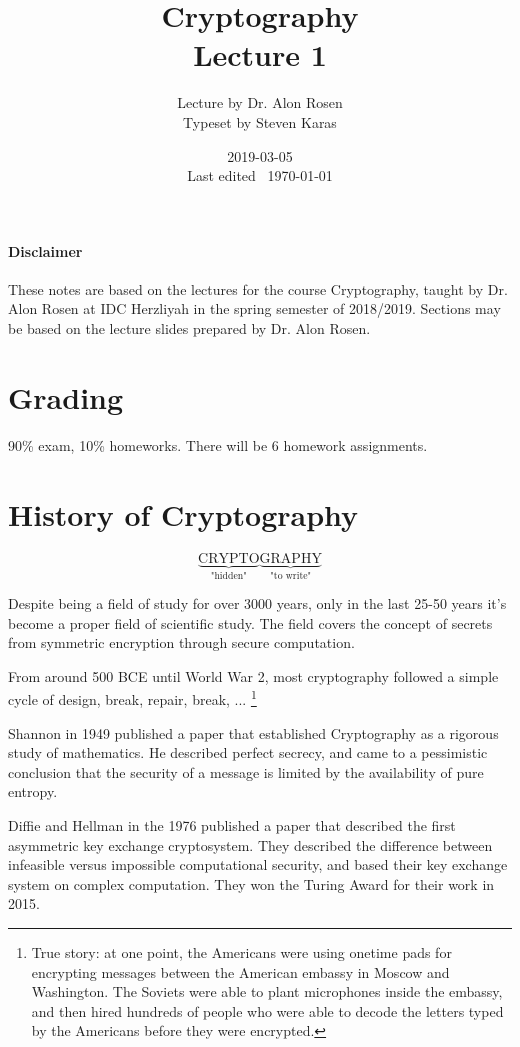\documentclass{idc_msc}
\title{Cryptography \\\large Lecture 1}
\date{2019-03-05 \\ Last edited \currenttime\ \today}
\author{Lecture by Dr. Alon Rosen\\Typeset by Steven Karas}
\begin{document}
\paragraph{Disclaimer}

These notes are based on the lectures for the course Cryptography, taught by Dr. Alon Rosen at IDC Herzliyah in the spring semester of 2018/2019.
Sections may be based on the lecture slides prepared by Dr. Alon Rosen.

\nocite{Katz:2014:IMC:2700550}
\nocite{Goldreich:2000:FCB:519078}

\section{Grading}

90\% exam, 10\% homeworks.
There will be 6 homework assignments.

\section{History of Cryptography}

\begin{center}
\[
  \underbrace{\text{CRYPTO}}_{\text{"hidden"}}
  \underbrace{\text{GRAPHY}}_{\text{"to write"}}
\]
\end{center}

Despite being a field of study for over 3000 years, only in the last 25-50 years it's become a proper field of scientific study.
The field covers the concept of secrets from symmetric encryption through secure computation.

From around 500 BCE until World War 2, most cryptography followed a simple cycle of design, break, repair, break, ...
\footnote{True story: at one point, the Americans were using onetime pads for encrypting messages between the American embassy in Moscow and Washington. The Soviets were able to plant microphones inside the embassy, and then hired hundreds of people who were able to decode the letters typed by the Americans before they were encrypted.}

Shannon in 1949\cite{Shannon:1949:CTSS:656715} published a paper that established Cryptography as a rigorous study of mathematics.
He described perfect secrecy, and came to a pessimistic conclusion that the security of a message is limited by the availability of pure entropy.

Diffie and Hellman in the 1976\cite{diffie1976new} published a paper that described the first asymmetric key exchange cryptosystem.
They described the difference between infeasible versus impossible computational security, and based their key exchange system on complex computation.
They won the Turing Award for their work in 2015.
\end{document}
